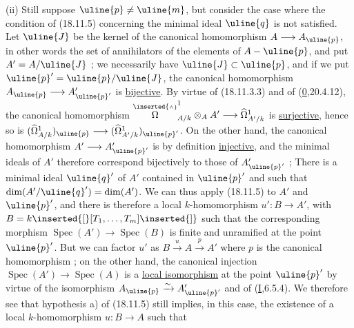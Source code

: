 (ii) Still suppose $\uline{p}\neq\uline{m}$, but consider the case where the condition of (18.11.5) concerning  the minimal ideal $\uline{q}$ is not satisfied. Let $\uline{J}$ be the kernel of the canonical homomorphism $A\longrightarrow A_{\uline{p}}$, in other words the set of annihilators of the elements of $A-\uline{p}$, and put $A'=A/\uline{J}$ ; we necessarily have $\uline{J}\subset\uline{p}$, and if we put $\uline{p}'=\uline{p}/\uline{J}$, the canonical homomorphism $A_{\uline{p}}\longrightarrow A'_{\uline{p}'}$ is \uline{bijective}. By virtue of (18.11.3.3) and of (\uline{0},20.4.12), the canonical homomorphism
$\overset{\inserted{\scriptscriptstyle\wedge}}{\Omega}^1_{A/k}\otimes_A A'\longrightarrow\widehat\Omega^1_{A'/k}$ is \uline{surjective}, hence so is $(\widehat\Omega^1_{A/k})_{\uline{p}}\longrightarrow(\widehat\Omega^1_{A'/k})_{\uline{p}'}$. On the other hand, the canonical homomorphism $A'\longrightarrow A'_{\uline{p}'}$ is by definition \uline{injective}, and the minimal  ideals of $A'$ therefore correspond bijectively to those of $A'_{\uline{p}'}$ ;  There is a minimal ideal $\uline{q}'$ of $A'$  contained in  $\uline{p}'$ and such that $\dim(A'/\uline{q}')=\dim(A')$. We can thus apply (18.11.5) to $A'$ and $\uline{p}'$, and there is therefore a local $k$-homomorphism $u':B\longrightarrow A'$, with $B=k\inserted{[}[T_1,\ldots,T_m]\inserted{]}$ such that the corresponding morphism $\operatorname{Spec}(A')\longrightarrow\operatorname{Spec}(B)$ is finite and unramified at the point $\uline{p}'$. But we can factor $u'$ as $B\xrightarrow{u}A\xrightarrow{p}A'$ where  $p$ is the canonical homomorphism ; on the other hand, the canonical injection $\operatorname{Spec}(A')\longrightarrow\operatorname{Spec}(A)$ is a  \uline{local isomorphism} at the point $\uline{p}'$ by virtue of the isomorphism $A_{\uline{p}}\xrightarrow{\sim}A'_{\uline{p}'}$ and of (\uline{I},6.5.4). We therefore see that hypothesis a) of (18.11.5) still implies, in this case, the existence of a local $k$-homomorphism $u:B\longrightarrow A$ such that

